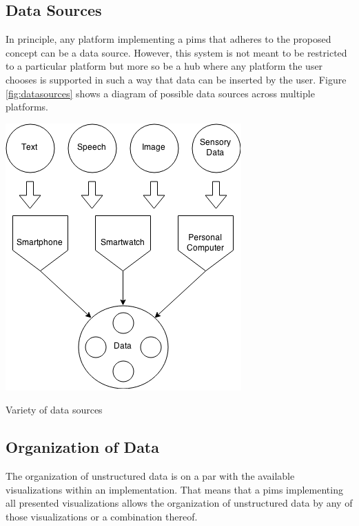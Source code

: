\subsection{Data Sources}

In principle, any platform implementing a \gls{pims} that adheres to the
proposed concept can be a data source. However, this system is not meant to be
restricted to a particular platform but more so be a hub where any platform the
user chooses is supported in such a way that data can be inserted by the user.
Figure \ref{fig:datasources} shows a diagram of possible data sources across
multiple platforms.

\begin{flfigure}
  \centering
    \includegraphics[width=0.9\linewidth]{00_resources/input_methods.png}
    \caption{Variety of data sources}
  \label{fig:datasources}
\end{flfigure}

\subsection{Organization of Data}

The organization of unstructured data is on a par with the available
visualizations within an implementation. That means that a \gls{pims}
implementing all presented visualizations allows the organization of unstructured
data by any of those visualizations or a combination thereof.


